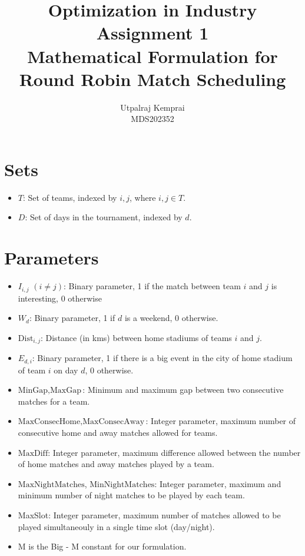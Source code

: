 \documentclass[a4paper, 12pt]{article}
\title{Optimization in Industry Assignment 1 \\ Mathematical Formulation for Round Robin Match Scheduling}
\author{Utpalraj Kemprai \\ MDS202352}
\date{}
\begin{document}
\maketitle

\section*{Sets}
\begin{itemize}
    \item $T$: Set of teams, indexed by $i, j$, where $i, j \in T$.
    \item $D$: Set of days in the tournament, indexed by $d$.
\end{itemize}

\section*{Parameters}
\begin{itemize}
    \item $I_{i,j}$ $(i \neq j)$: Binary parameter, 1 if the match between team $i$ and $j$ is interesting, 0 otherwise
    \item $W_{d}$: Binary parameter, 1 if $d$ is a weekend, 0 otherwise.
    \item $\text{Dist}_{i,j}$: Distance (in kms) between home stadiums of teams $i$ and $j$.
    \item $E_{d,i}$: Binary parameter, 1 if there is a big event in the city of home stadium of team $i$ on day $d$, 0 otherwise.
    \item $\text{MinGap}, \text{MaxGap}$: Minimum and maximum gap between two consecutive matches for a team.
    \item $\text{MaxConsecHome},\text{MaxConsecAway}$: Integer parameter, maximum number of consecutive home and away matches allowed for teams.
    \item $\text{MaxDiff}$: Integer parameter, maximum difference allowed between the number of home matches and away matches played by a team.
    \item $\text{MaxNightMatches}$, $\text{MinNightMatches}$: Integer parameter, maximum and minimum number of night matches to be played by each team.
    \item MaxSlot: Integer parameter, maximum number of matches allowed to be played simultaneouly in a single time slot (day/night).
    \item M is the Big - M constant for our formulation.
\end{itemize}
\end{document}
